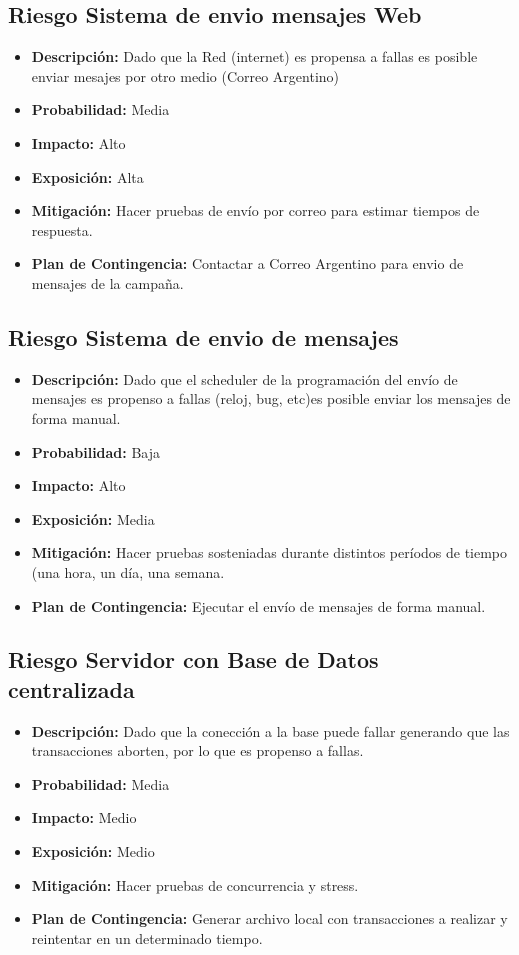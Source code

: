 \documentclass[a4paper, 11pt]{article}
\begin{document}
\subsection{Riesgo Sistema de envio mensajes Web}
\begin{itemize}
\item \textbf{Descripci\'on:} Dado que la Red (internet) es propensa a fallas es posible enviar mesajes por otro medio (Correo Argentino) 
\item \textbf{Probabilidad:} Media 
\item \textbf{Impacto:} Alto
\item \textbf{Exposici\'on:} Alta
\item \textbf{Mitigaci\'on:} Hacer pruebas de env\'io por correo para estimar tiempos de respuesta. 
\item \textbf{Plan de Contingencia:} Contactar a Correo Argentino para envio de mensajes de la campa\~na.
\end{itemize}

\subsection{Riesgo Sistema de envio de mensajes}
\begin{itemize}
\item \textbf{Descripci\'on:} Dado que el scheduler de la programaci\'on del env\'io de mensajes es propenso a fallas (reloj, bug, etc)es posible enviar los mensajes de forma manual.
\item \textbf{Probabilidad:} Baja
\item \textbf{Impacto:} Alto
\item \textbf{Exposici\'on:} Media
\item \textbf{Mitigaci\'on:} Hacer pruebas sosteniadas durante distintos per\'iodos de tiempo (una hora, un d\'ia, una semana.
\item \textbf{Plan de Contingencia:} Ejecutar el env\'io de mensajes de forma manual.
\end{itemize}

\subsection{Riesgo Servidor con Base de Datos centralizada}
\begin{itemize}

\item \textbf{Descripci\'on:} Dado que la conección a la base puede fallar generando que las transacciones aborten, por lo que es propenso a fallas.
\item \textbf{Probabilidad:} Media
\item \textbf{Impacto:} Medio
\item \textbf{Exposici\'on:} Medio
\item \textbf{Mitigaci\'on:} Hacer pruebas de concurrencia y stress.
\item \textbf{Plan de Contingencia:} Generar archivo local con transacciones a realizar y reintentar en un determinado tiempo.
\end{itemize}
\end{document}

